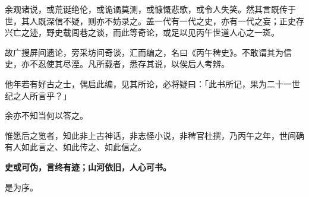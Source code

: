 余观诸说，或荒诞绝伦，或诡谲莫测，或慷慨悲歌，或令人失笑。然其言既传于世，其人既深信不疑，则亦不妨录之。盖一代有一代之史，亦有一代之妄；正史存兴亡之迹，野史载闾巷之谈，而此等奇论，或足以见丙午世道人心之一斑。

故广搜屏间遗论，旁采坊间奇谈，汇而编之，名曰《丙午稗史》。不敢谓其为信史，亦不忍使其尽湮。凡所载者，悉存其说，以俟后人考辨。

他年若有好古之士，偶启此编，见其所论，必将疑曰：「此书所记，果为二十一世纪之人所言乎？」

余亦不知当何以答之。

惟愿后之览者，知此非上古神话，非志怪小说，非稗官杜撰，乃丙午之年，世间确有人如此言之、如此传之、如此信之。

\textbf{史或可伪，言终有迹；山河依旧，人心可书。}

是为序。



